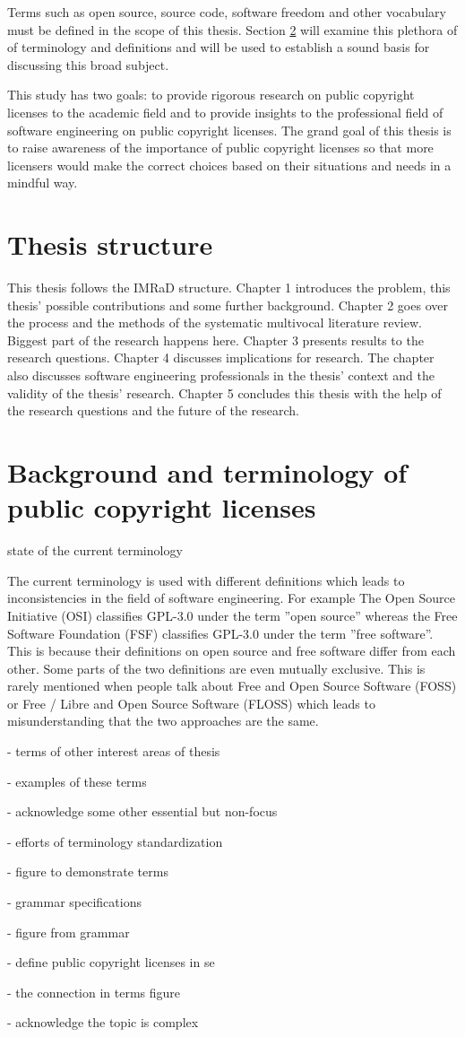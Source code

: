 Terms such as open source, source code, software freedom and other vocabulary must be defined in the scope of this thesis. Section \ref{sec:bg} will examine this plethora of of terminology and definitions and will be used to establish a sound basis for discussing this broad subject.

This study has two goals: to provide rigorous research on public copyright licenses to the academic field and to provide insights to the professional field of software engineering on public copyright licenses. The grand goal of this thesis is to raise awareness of the importance of public copyright licenses so that more licensers would make the correct choices based on their situations and needs in a mindful way.

\section{Thesis structure}
This thesis follows the IMRaD structure. Chapter 1 introduces the problem, this thesis' possible contributions and some further background. Chapter 2 goes over the process and the methods of the systematic multivocal literature review. Biggest part of the research happens here. Chapter 3 presents results to the research questions. Chapter 4 discusses implications for research. The chapter also discusses software engineering professionals in the thesis' context and the validity of the thesis' research. Chapter 5 concludes this thesis with the help of the research questions and the future of the research.

\section{Background and terminology of public copyright licenses}
\label{sec:bg}
state of the current terminology

The current terminology is used with different definitions which leads to inconsistencies in the field of software engineering. For example The Open Source Initiative (OSI) classifies GPL-3.0 under the term ''open source'' whereas the Free Software Foundation (FSF) classifies GPL-3.0 under the term ''free software''. This is because their definitions on open source and free software differ from each other. Some parts of the two definitions are even mutually exclusive. This is rarely mentioned when people talk about Free and Open Source Software (FOSS) or Free / Libre and Open Source Software (FLOSS) which leads to misunderstanding that the two approaches are the same.

- terms of other interest areas of thesis

- examples of these terms

- acknowledge some other essential but non-focus

- efforts of terminology standardization

- figure to demonstrate terms

- grammar specifications

- figure from grammar

- define public copyright licenses in se

- the connection in terms figure

- acknowledge the topic is complex